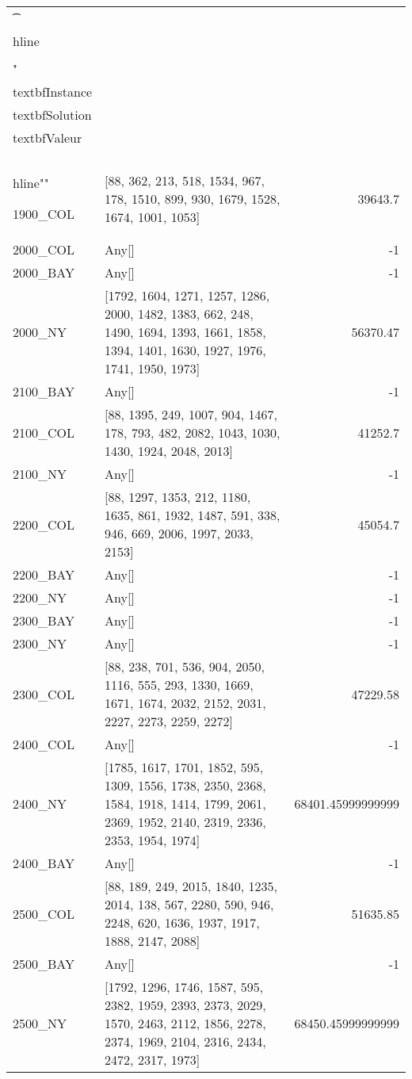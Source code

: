 \documentclass[main.tex]{subfiles}
\begin{document}
\begin{center}
\renewcommand{\arraystretch}{1.4} 
\begin{tabular}{llr}\n\t\\hline\n\\\\\n
"\\textbf{Instance} & \\textbf{Solution} & \\textbf{Valeur} \\\\\\hline\n""

1900\_COL & [88, 362, 213, 518, 1534, 967, 178, 1510, 899, 930, 1679, 1528, 1674, 1001, 1053] & 39643.7\\
2000\_COL & Any[] & -1\\
2000\_BAY & Any[] & -1\\
2000\_NY & [1792, 1604, 1271, 1257, 1286, 2000, 1482, 1383, 662, 248, 1490, 1694, 1393, 1661, 1858, 1394, 1401, 1630, 1927, 1976, 1741, 1950, 1973] & 56370.47\\
2100\_BAY & Any[] & -1\\
2100\_COL & [88, 1395, 249, 1007, 904, 1467, 178, 793, 482, 2082, 1043, 1030, 1430, 1924, 2048, 2013] & 41252.7\\
2100\_NY & Any[] & -1\\
2200\_COL & [88, 1297, 1353, 212, 1180, 1635, 861, 1932, 1487, 591, 338, 946, 669, 2006, 1997, 2033, 2153] & 45054.7\\
2200\_BAY & Any[] & -1\\
2200\_NY & Any[] & -1\\
2300\_BAY & Any[] & -1\\
2300\_NY & Any[] & -1\\
2300\_COL & [88, 238, 701, 536, 904, 2050, 1116, 555, 293, 1330, 1669, 1671, 1674, 2032, 2152, 2031, 2227, 2273, 2259, 2272] & 47229.58\\
2400\_COL & Any[] & -1\\
2400\_NY & [1785, 1617, 1701, 1852, 595, 1309, 1556, 1738, 2350, 2368, 1584, 1918, 1414, 1799, 2061, 2369, 1952, 2140, 2319, 2336, 2353, 1954, 1974] & 68401.45999999999\\
2400\_BAY & Any[] & -1\\
2500\_COL & [88, 189, 249, 2015, 1840, 1235, 2014, 138, 567, 2280, 590, 946, 2248, 620, 1636, 1937, 1917, 1888, 2147, 2088] & 51635.85\\
2500\_BAY & Any[] & -1\\
2500\_NY & [1792, 1296, 1746, 1587, 595, 2382, 1959, 2393, 2373, 2029, 1570, 2463, 2112, 1856, 2278, 2374, 1969, 2104, 2316, 2434, 2472, 2317, 1973] & 68450.45999999999\\
\hline\end{tabular}
\end{center}
\end{document}
